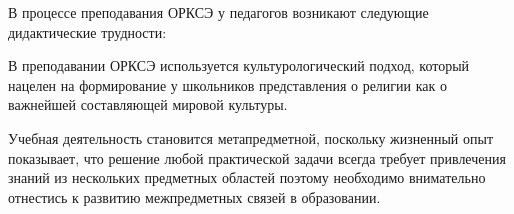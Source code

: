 
В процессе преподавания ОРКСЭ у педагогов возникают следующие дидактические трудности:

В преподавании ОРКСЭ используется культурологический подход, который нацелен на формирование у школьников представления о религии как о важнейшей составляющей мировой культуры.


Учебная деятельность становится метапредметной, поскольку жизненный опыт показывает, что решение любой практической задачи всегда требует привлечения знаний из нескольких предметных областей поэтому необходимо внимательно отнестись к развитию межпредметных связей в образовании\cite{metapredmet}.







